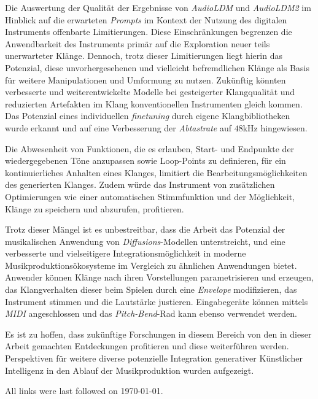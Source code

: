 \documentclass[
  a4paper,  %
  twoside,  %
  bibliography=totoc,
  headsepline,
  cleardoublepage=empty,
  parskip=half,
  draft=false
]{scrbook}
\begin{document}
{Die Auswertung der Qualität der Ergebnisse von \emph{AudioLDM} \cite{liu_audioldm_2023} und \emph{AudioLDM2} \cite{liu_audioldm2_2023} im Hinblick auf die erwarteten \emph{Prompts} im Kontext der Nutzung des digitalen Instruments offenbarte Limitierungen. Diese Einschränkungen begrenzen die Anwendbarkeit des Instruments primär auf die Exploration neuer teils unerwarteter Klänge. Dennoch, trotz dieser Limitierungen liegt hierin das Potenzial, diese unvorhergesehenen und vielleicht befremdlichen Klänge als Basis für weitere Manipulationen und Umformung zu nutzen. Zukünftig könnten verbesserte und weiterentwickelte Modelle bei gesteigerter Klangqualität und reduzierten Artefakten im Klang konventionellen Instrumenten gleich kommen. Das Potenzial eines individuellen \emph{finetuning} durch eigene Klangbibliotheken wurde erkannt und auf eine Verbesserung der \emph{Abtastrate} auf $48$kHz hingewiesen. 

Die Abwesenheit von Funktionen, die es erlauben, Start- und Endpunkte der wiedergegebenen Töne anzupassen sowie Loop-Points zu definieren, für ein kontinuierliches Anhalten eines Klanges, limitiert die Bearbeitungsmöglichkeiten des generierten Klanges. Zudem würde das Instrument von zusätzlichen Optimierungen wie einer automatischen Stimmfunktion und der Möglichkeit, Klänge zu speichern und abzurufen, profitieren.

Trotz dieser Mängel ist es unbestreitbar, dass die Arbeit das Potenzial der musikalischen Anwendung von \emph{Diffusions}-Modellen unterstreicht, und eine verbesserte und vielseitigere Integrationsmöglichkeit in moderne Musikproduktionsökosysteme im Vergleich zu ähnlichen Anwendungen bietet. Anwender können Klänge nach ihren Vorstellungen parametrisieren und erzeugen, das Klangverhalten dieser beim Spielen durch eine \emph{Envelope} modifizieren, das Instrument stimmen und die Lautstärke justieren. Eingabegeräte können mittels \emph{MIDI} angeschlossen und das \emph{Pitch-Bend}-Rad kann ebenso verwendet werden.

Es ist zu hoffen, dass zukünftige Forschungen in diesem Bereich von den in dieser Arbeit gemachten Entdeckungen profitieren und diese weiterführen werden. Perspektiven für weitere diverse potenzielle Integration generativer Künstlicher Intelligenz in den Ablauf der Musikproduktion wurden aufgezeigt. 

\label{sec:conclusion}


\printbibliography

All links were last followed on \today{}.

}
\end{document}

